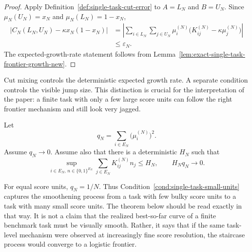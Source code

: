 \begin{proof}
Apply Definition~\ref{def:single-task-cut-error} to $A=L_N$ and $B=U_N$. Since $\mu_N(U_N)=x_N$ and $\mu_N(L_N)=1-x_N$,
\begin{align*}
    \left|C_N(L_N,U_N)-\kappa x_N(1-x_N)\right|
    &=
    \left|
    \sum_{i\in L_N}\sum_{j\in U_N}
    \mu_i^{(N)}\bigl(K_{ij}^{(N)}-\kappa\mu_j^{(N)}\bigr)
    \right| \\
    &\le \varepsilon_N.
\end{align*}
The expected-growth-rate statement follows from Lemma~\ref{lem:exact-single-task-frontier-growth-new}.
\end{proof}

Cut mixing controls the deterministic expected growth rate. A separate condition controls the visible jump size. This distinction is crucial for the interpretation of the paper: a finite task with only a few large score units can follow the right frontier mechanism and still look very jagged.

\begin{condition}
\label{cond:single-task-small-units}
Let
\begin{equation*}
    q_N=\sum_{i\in E_N}\bigl(\mu_i^{(N)}\bigr)^2.
\end{equation*}
Assume $q_N\to0$. Assume also that there is a deterministic $H_N$ such that
\begin{equation*}
    \sup_{i\in E_N,\,n\in\{0,1\}^{E_N}}\sum_{j\in E_N}K_{ij}^{(N)}n_j\le H_N,
    \qquad
    H_Nq_N\to0.
\end{equation*}
\end{condition}

For equal score units, $q_N=1/N$. Thus Condition~\ref{cond:single-task-small-units} captures the smoothening process from a task with few bulky score units to a task with many small score units. The theorem below should be read exactly in that way. It is not a claim that the realized best-so-far curve of a finite benchmark task must be visually smooth. Rather, it says that if the same task-level mechanism were observed at increasingly fine score resolution, the staircase process would converge to a logistic frontier.

